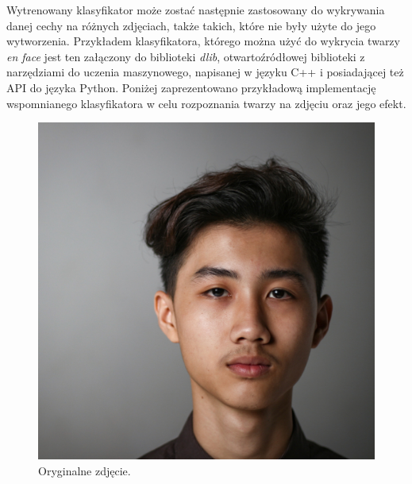 \documentclass[12pt,a4paper,leqno,oneside,titlepage]{book}
\begin{document}
Wytrenowany klasyfikator może zostać następnie zastosowany do wykrywania danej cechy na różnych zdjęciach, także takich, które nie były użyte do jego wytworzenia. Przykładem klasyfikatora, którego można użyć do wykrycia twarzy \textit{en face} jest ten załączony do biblioteki \textit{dlib}, otwartoźródłowej biblioteki z narzędziami do uczenia maszynowego, napisanej w języku C++ i posiadającej też API do języka Python.\cite{dlibPage} Poniżej zaprezentowano przykładową implementację wspomnianego klasyfikatora w celu rozpoznania twarzy na zdjęciu oraz jego efekt.



\begin{figure}[!tbp]
  \centering
  \begin{minipage}[b]{0.4\textwidth}
    \includegraphics[width=\textwidth]{pictures/face.jpg}
    \caption{Oryginalne zdjęcie.\cite{Putera}}
  \end{minipage}
  \hfill
  \begin{minipage}[b]{0.4\textwidth}

\end{minipage}
\end{figure}
\end{document}
